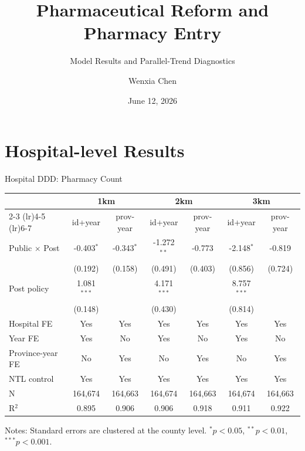 \documentclass{beamer}
\title{Pharmaceutical Reform and Pharmacy Entry}
\subtitle{Model Results and Parallel-Trend Diagnostics}
\author{Wenxia Chen}
\date{June 12, 2026}
\begin{document}
\frame{\titlepage}


\section{Hospital-level Results}

\begin{frame}{Hospital DDD: Pharmacy Count}

\centering
\scriptsize
\setlength{\tabcolsep}{3pt}

\begin{tabular}{lcccccc}
\toprule
& \multicolumn{2}{c}{1km} & \multicolumn{2}{c}{2km} & \multicolumn{2}{c}{3km} \\
\cmidrule(lr){2-3} \cmidrule(lr){4-5} \cmidrule(lr){6-7}
& id+year & prov-year & id+year & prov-year & id+year & prov-year \\
\midrule
Public $\times$ Post
& -0.403$^{*}$ & -0.343$^{*}$
& -1.272$^{**}$ & -0.773
& -2.148$^{*}$ & -0.819 \\
& (0.192) & (0.158)
& (0.491) & (0.403)
& (0.856) & (0.724) \\
\addlinespace
Post policy
& 1.081$^{***}$ & 
& 4.171$^{***}$ &
& 8.757$^{***}$ & \\
& (0.148) &
& (0.430) &
& (0.814) & \\
\midrule
Hospital FE & Yes & Yes & Yes & Yes & Yes & Yes \\
Year FE & Yes & No & Yes & No & Yes & No \\
Province-year FE & No & Yes & No & Yes & No & Yes \\
NTL control & Yes & Yes & Yes & Yes & Yes & Yes \\
\midrule
N & 164,674 & 164,663 & 164,674 & 164,663 & 164,674 & 164,663 \\
R$^2$ & 0.895 & 0.906 & 0.906 & 0.918 & 0.911 & 0.922 \\
\bottomrule
\end{tabular}

\vspace{0.4em}
\raggedright
\tiny Notes: Standard errors are clustered at the county level. $^{*}p<0.05$, $^{**}p<0.01$, $^{***}p<0.001$.

\end{frame}
\end{document}
